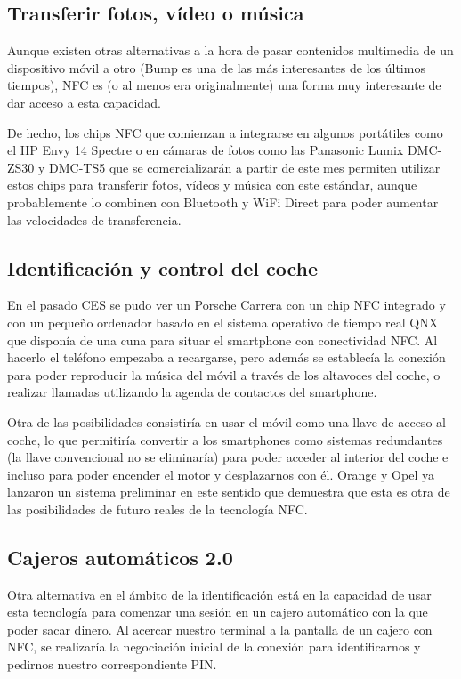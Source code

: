 \subsection{Transferir fotos, vídeo o música}
Aunque existen otras alternativas a la hora de pasar contenidos multimedia de un dispositivo móvil a otro (Bump es una de las más interesantes de los últimos tiempos), NFC es (o al menos era originalmente) una forma muy interesante de dar acceso a esta capacidad.

De hecho, los chips NFC que comienzan a integrarse en algunos portátiles como el HP Envy 14 Spectre o en cámaras de fotos como las Panasonic Lumix DMC-ZS30 y DMC-TS5 que se comercializarán a partir de este mes permiten utilizar estos chips para transferir fotos, vídeos y música con este estándar, aunque probablemente lo combinen con Bluetooth y WiFi Direct para poder aumentar las velocidades de transferencia. 

\subsection{Identificación y control del coche}
En el pasado CES se pudo ver un Porsche Carrera con un chip NFC integrado y con un pequeño ordenador basado en el sistema operativo de tiempo real QNX que disponía de una cuna para situar el smartphone con conectividad NFC. Al hacerlo el teléfono empezaba a recargarse, pero además se establecía la conexión para poder reproducir la música del móvil a través de los altavoces del coche, o realizar llamadas utilizando la agenda de contactos del smartphone.

Otra de las posibilidades consistiría en usar el móvil como una llave de acceso al coche, lo que permitiría convertir a los smartphones como sistemas redundantes (la llave convencional no se eliminaría) para poder acceder al interior del coche e incluso para poder encender el motor y desplazarnos con él. Orange y Opel ya lanzaron un sistema preliminar en este sentido que demuestra que esta es otra de las posibilidades de futuro reales de la tecnología NFC.

\subsection{Cajeros automáticos 2.0}
Otra alternativa en el ámbito de la identificación está en la capacidad de usar esta tecnología para comenzar una sesión en un cajero automático con la que poder sacar dinero. Al acercar nuestro terminal a la pantalla de un cajero con NFC, se realizaría la negociación inicial de la conexión para identificarnos y pedirnos nuestro correspondiente PIN.

